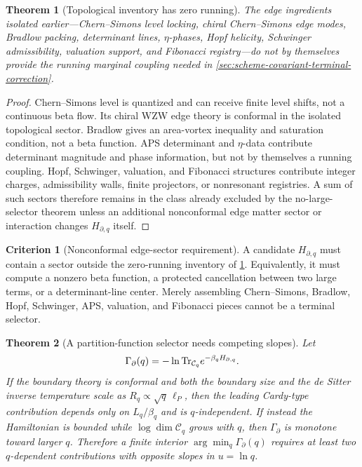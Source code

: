 \documentclass[aps,prd,reprint,nofootinbib,superscriptaddress,floatfix]{revtex4-2}
\numberwithin{equation}{section}
\theoremstyle{definition}
\newtheorem{criterion}{Criterion}[section]
\theoremstyle{plain}
\newtheorem{theorem}{Theorem}[section]
\begin{document}
\begin{theorem}[Topological inventory has zero running]\label{thm:zero-running-inventory}
The edge ingredients isolated earlier---Chern--Simons level locking,
chiral Chern--Simons edge modes, Bradlow packing, determinant lines,
\(\eta\)-phases, Hopf helicity, Schwinger admissibility, valuation support,
and Fibonacci registry---do not by themselves provide the running marginal
coupling needed in \cref{sec:scheme-covariant-terminal-correction}.
\end{theorem}

\begin{proof}
Chern--Simons level is quantized and can receive finite level shifts, not a
continuous beta flow.  Its chiral WZW edge theory is conformal in the isolated
topological sector.  Bradlow gives an area-vortex inequality and saturation
condition, not a beta function.  APS determinant and \(\eta\)-data contribute
determinant magnitude and phase information, but not by themselves a running
coupling.  Hopf, Schwinger, valuation, and Fibonacci structures contribute
integer charges, admissibility walls, finite projectors, or nonresonant
registries.  A sum of such sectors therefore remains in the class already
excluded by the no-large-selector theorem unless an additional nonconformal
edge matter sector or interaction changes \(H_{\partial,q}\) itself.
\end{proof}

\begin{criterion}[Nonconformal edge-sector requirement]\label{crit:nonconformal-edge}
A candidate \(H_{\partial,q}\) must contain a sector outside the zero-running
inventory of \cref{thm:zero-running-inventory}.  Equivalently, it must
compute a nonzero beta function, a protected cancellation between two large
terms, or a determinant-line center.  Merely assembling Chern--Simons,
Bradlow, Hopf, Schwinger, APS, valuation, and Fibonacci pieces cannot be a
terminal selector.
\end{criterion}

\begin{theorem}[A partition-function selector needs competing slopes]\label{thm:argmin-obstruction}
Let
\[
        \Gamma_\partial(q)
        =
        -\ln{\rm Tr}_{\mathcal C_q}e^{-\beta_qH_{\partial,q}} .
\]
If the boundary theory is conformal and both the boundary size and the
de Sitter inverse temperature scale as \(R_q\propto\sqrt q\,\ell_P\), then
the leading Cardy-type contribution depends only on \(L_q/\beta_q\) and is
\(q\)-independent.  If instead the Hamiltonian is bounded while
\(\log\dim\mathcal C_q\) grows with \(q\), then \(\Gamma_\partial\) is
monotone toward larger \(q\).  Therefore a finite interior
\(\arg\min_q\Gamma_\partial(q)\) requires at least two \(q\)-dependent
contributions with opposite slopes in \(u=\ln q\).
\end{theorem}
\end{document}
